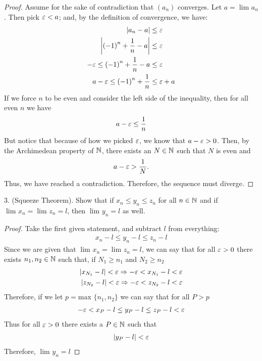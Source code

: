 \begin{enumerate}
	\begin{proof}
			Assume for the sake of contradiction that $\left( a_n \right) $ converges. Let $a = \lim_{} a_n$. Then pick  $\e < a$; and, by the definition of convergence, we have:
			\begin{align}
				\left|a_n - a\right| &\le \e\\	
				\left|\left( -1 \right)^{n} + \frac{1}{n} - a \right| &\le \e \\
				-\e \le \left( -1 \right)^{n} + \frac{1}{n} - a &\le \e 	\\
				a -\e \le \left( -1 \right)^{n} + \frac{1}{n} &\le \e+ a 	
			\end{align}
			If we force $n$ to be even and consider the left side of the inequality, then for all even $n$ we have
			\begin{align}
				a - \e \le \frac{1}{n}
			\end{align}
			But notice that because of how we picked $\e$, we know that $a - \e > 0$. Then, by the Archimedean property of $\mathbb{N}$, there exists an $N \in \mathbb{N}$ such that $N$ is even and 
			\begin{align}
			a - \e > \frac{1}{N}. 
			\end{align}
			Thus, we have reached a contradiction. Therefore, the sequence must diverge.
	\end{proof}



	
	\end{enumerate}

3. (Squeeze Theorem). Show that if $x_n \le y_n \le z_n$ for all $n \in \mathbb{N}$ and if $\lim_{} x_n = \lim_{} z_n = l$, then $\lim_{} y_n = l$ as well.

\begin{proof}
	Take the first given statement, and subtract $l$ from everything: 
	\begin{align}
		x_n - l \le y_n - l \le z_n - l
	\end{align}
	Since we are given that $\lim_{} x_n = \lim_{} z_n = l$, we can say that for all $\e > 0$ there exists $n_1, n_2 \in \mathbb{N}$ such that, if $N_1 \ge  n_1$ and $N_2 \ge n_2$  
	\begin{align}
		\left|x_{N_1} - l\right| < \e \implies -\e < x_{N_1} - l < \e \\
		\left|z_{N_2} - l\right| < \e \implies -\e < z_{N_2} - l < \e
	\end{align}
	Therefore, if we let $p = \text{max }\{n_1, n_2\} $ we can say that for all $P > p$
	\begin{align}
		-\e < x_P - l \le y_P -l \le z_P - l < \e  
	\end{align}
	Thus for all $\e > 0$ there exists a $P \in \mathbb{N}$ such that 
	\begin{align}
		\left|y_P - l\right| < \e 
	\end{align}
	Therefore, $\lim_{} y_n = l$
	
\end{proof}

